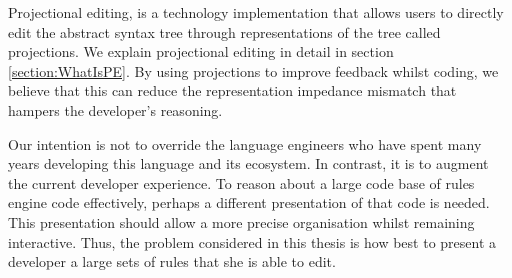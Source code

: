 Projectional editing, is a technology implementation that allows users to directly edit the abstract syntax tree through representations of the tree called projections.
We explain projectional editing in detail in section \ref{section:WhatIsPE}.
By using projections to improve feedback whilst coding, we believe that this can reduce the representation impedance mismatch that hampers the developer's reasoning.

Our intention is not to override the language engineers who have spent many years developing this language and its ecosystem.
In contrast, it is to augment the current developer experience.
To reason about a large code base of rules engine code effectively, perhaps a different presentation of that code is needed.
This presentation should allow a more precise organisation whilst remaining interactive.
Thus, the problem considered in this thesis is how best to present a developer a large sets of rules that she is able to edit. 

